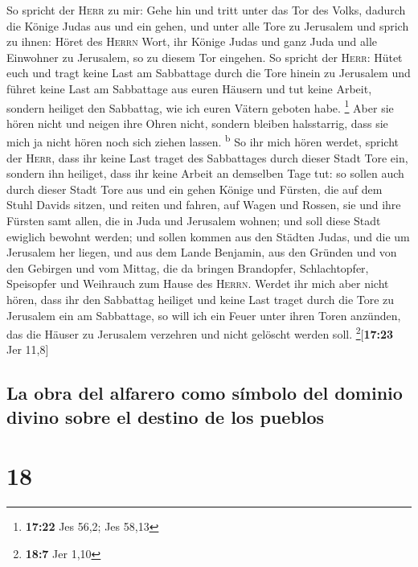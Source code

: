  So spricht der \textsc{Herr} zu mir: Gehe hin und tritt
unter das Tor des Volks, dadurch die Könige Judas aus und ein gehen, und
unter alle Tore zu Jerusalem  und sprich zu ihnen: Höret
des \textsc{Herrn} Wort, ihr Könige Judas und ganz Juda und alle
Einwohner zu Jerusalem, so zu diesem Tor eingehen.  So
spricht der \textsc{Herr}: Hütet euch und tragt keine Last am Sabbattage
durch die Tore hinein zu Jerusalem  und führet keine Last
am Sabbattage aus euren Häusern und tut keine Arbeit, sondern heiliget
den Sabbattag, wie ich euren Vätern geboten habe. \footnote{\textbf{17:22}
  Jes 56,2; Jes 58,13}  Aber sie hören nicht und neigen
ihre Ohren nicht, sondern bleiben halsstarrig, dass sie mich ja nicht
hören noch sich ziehen lassen. \textsuperscript{b}  So
ihr mich hören werdet, spricht der \textsc{Herr}, dass ihr keine Last
traget des Sabbattages durch dieser Stadt Tore ein, sondern ihn
heiliget, dass ihr keine Arbeit an demselben Tage tut: 
so sollen auch durch dieser Stadt Tore aus und ein gehen Könige und
Fürsten, die auf dem Stuhl Davids sitzen, und reiten und fahren, auf
Wagen und Rossen, sie und ihre Fürsten samt allen, die in Juda und
Jerusalem wohnen; und soll diese Stadt ewiglich bewohnt werden;
 und sollen kommen aus den Städten Judas, und die um
Jerusalem her liegen, und aus dem Lande Benjamin, aus den Gründen und
von den Gebirgen und vom Mittag, die da bringen Brandopfer,
Schlachtopfer, Speisopfer und Weihrauch zum Hause des \textsc{Herrn}.
 Werdet ihr mich aber nicht hören, dass ihr den Sabbattag
heiliget und keine Last traget durch die Tore zu Jerusalem ein am
Sabbattage, so will ich ein Feuer unter ihren Toren anzünden, das die
Häuser zu Jerusalem verzehren und nicht gelöscht werden soll.
\footnote{\textbf{18:7} Jer 1,10}{[}\textbf{17:23} Jer 11,8{]}

\hypertarget{la-obra-del-alfarero-como-suxedmbolo-del-dominio-divino-sobre-el-destino-de-los-pueblos}{%
\subsection{La obra del alfarero como símbolo del dominio divino sobre
el destino de los
pueblos}\label{la-obra-del-alfarero-como-suxedmbolo-del-dominio-divino-sobre-el-destino-de-los-pueblos}}

\hypertarget{section-17}{%
\section{18}\label{section-17}}

